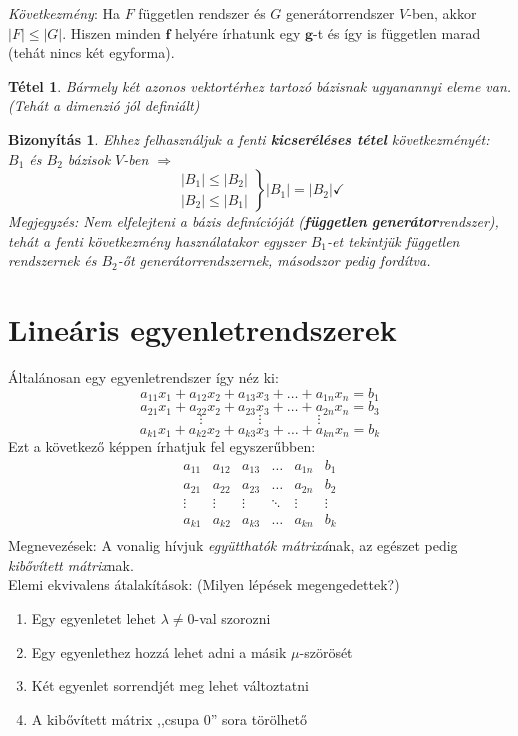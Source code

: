 \documentclass[a4paper,12pt,twoside]{book}
\newcommand{\vek}[1]{\mathbf{#1}} %
\newtheorem{tetel}{Tétel}[chapter]
\theoremstyle{break}
\newtheorem{bizNL}[biz]{Bizonyítás}
\begin{document}
\textit{Következmény}: Ha $F$ független rendszer és $G$ generátorrendszer $V$-ben, akkor $|F| \leqslant |G|$. Hiszen minden $\vek{f}$ helyére írhatunk egy $\vek{g}$-t és így is független marad (tehát nincs két egyforma).

\begin{tetel}
Bármely két azonos vektortérhez tartozó bázisnak ugyanannyi eleme van. (Tehát a dimenzió jól definiált)
\end{tetel}
\begin{bizNL}
Ehhez felhasználjuk a fenti \textbf{kicseréléses tétel} következményét:\\
$B_1$ és $B_2$ bázisok $V$-ben $\Rightarrow$
\[
\left.\begin{array}{c}
  |B_1| \leqslant |B_2| \\
  |B_2| \leqslant |B_1|
\end{array}\right\} |B_1| = |B_2| \checkmark
\]
\textit{Megjegyzés}: Nem elfelejteni a bázis definícióját (\textbf{független} \textbf{generátor}rendszer), tehát a fenti következmény használatakor egyszer $B_1$-et tekintjük független rendszernek és $B_2$-őt generá\-torrendszernek, másodszor pedig fordítva.
\end{bizNL}

\section{Lineáris egyenletrendszerek}

Általánosan egy egyenletrendszer így néz ki:
\[a_{11}x_1+a_{12}x_2+a_{13}x_3+\ldots+a_{1n}x_n=b_1\]
\[a_{21}x_1+a_{22}x_2+a_{23}x_3+\ldots+a_{2n}x_n=b_3\]
\[\vdots \qquad\qquad \vdots \qquad\qquad \vdots\]
\[a_{k1}x_1+a_{k2}x_2+a_{k3}x_3+\ldots+a_{kn}x_n=b_k\]
Ezt a következő képpen írhatjuk fel egyszerűbben:
\[\begin{array}{ccccc|c}
a_{11} & a_{12} & a_{13} & \ldots & a_{1n} & b_1\\
a_{21} & a_{22} & a_{23} & \ldots & a_{2n} & b_2\\
\vdots & \vdots & \vdots & \ddots & \vdots & \vdots\\
a_{k1} & a_{k2} & a_{k3} & \ldots & a_{kn} & b_k\\
\end{array}\]
Megnevezések: A vonalig hívjuk \textit{együtthatók mátrixá}nak, az egészet pedig \textit{kibővített mátrix}nak.\\

Elemi ekvivalens átalakítások: (Milyen lépések megengedettek?)
\begin{enumerate}
\setlength{\itemsep}{1pt}
\setlength{\parskip}{0pt}
\setlength{\parsep}{0pt}
 \item Egy egyenletet lehet $\lambda\neq 0$-val szorozni
 \item Egy egyenlethez hozzá lehet adni a másik $\mu$-szörösét
 \item Két egyenlet sorrendjét meg lehet változtatni
 \item A kibővített mátrix ,,csupa 0'' sora törölhető
\end{enumerate}
\end{document}
